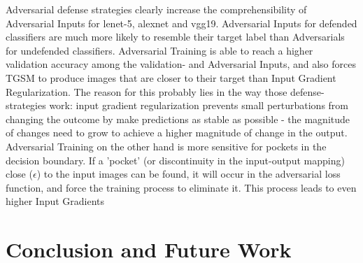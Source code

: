 \documentclass[draft,final]{vutinfth} %
\begin{document}
Adversarial defense strategies clearly increase the comprehensibility of Adversarial Inputs for lenet-5, alexnet and vgg19.
Adversarial Inputs for defended classifiers are much more likely to resemble their target label than Adversarials for undefended classifiers.
Adversarial Training is able to reach a higher validation accuracy among the validation- and Adversarial Inputs, and also forces TGSM to produce images that are closer to their target than Input Gradient Regularization.
The reason for this probably lies in the way those defense-strategies work: input gradient regularization prevents small perturbations from changing the outcome by make predictions as stable as possible - the magnitude of changes need to grow to achieve a higher magnitude of change in the output.
Adversarial Training on the other hand is more sensitive for pockets in the decision boundary.
If a 'pocket' (or discontinuity in the input-output mapping) close ($\epsilon$) to the input images can be found, it will occur in the adversarial loss function, and force the training process to eliminate it.
This process leads to even higher Input Gradients



\chapter{Conclusion and Future Work}

\backmatter

\listoffigures %

\listoftables %

\listofalgorithms
{}

\printindex

\printglossaries



\end{document}
